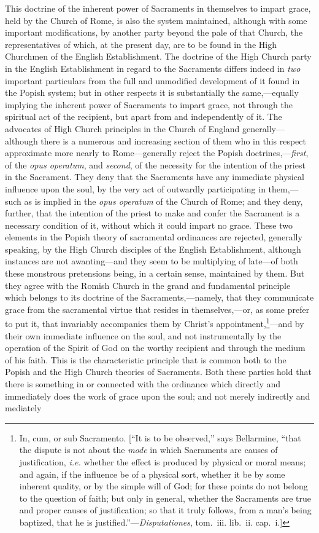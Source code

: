 \documentclass[
  english,
]{book}
\providecommand{\textlatin}{}
\renewcommand{\textlatin}[2][]{\foreignlanguage{latin}{#2}}
\begin{document}
This doctrine of the inherent power of Sacraments in themselves to impart grace, held by the Church of Rome, is also the system maintained, although with some important modifications, by another party beyond the pale of that Church, the representatives of which, at the present day, are to be found in the High Churchmen of the English Establishment. The doctrine of the High Church party in the English Establishment in regard to the Sacraments differs indeed in \emph{two} important particulars from the full and unmodified development of it found in the Popish system; but in other respects it is substantially the same,---equally implying the inherent power of Sacraments to impart grace, not through the spiritual act of the recipient, but apart from and independently of it. The advocates of High Church principles in the Church of England generally---although there is a numerous and increasing section of them who in this respect approximate more nearly to Rome---generally reject the Popish doctrines,---\emph{first}, of the \textlatin{\emph{opus operatum}}, and \emph{second}, of the necessity for the intention of the priest in the Sacrament. They deny that the Sacraments have any immediate physical influence upon the soul, by the very act of outwardly participating in them,---such as is implied in the \textlatin{\emph{opus operatum}} of the Church of Rome; and they deny, further, that the intention of the priest to make and confer the Sacrament is a necessary condition of it, without which it could impart no grace. These two elements in the Popish theory of sacramental ordinances are rejected, generally speaking, by the High Church disciples of the English Establishment, although instances are not awanting---and they seem to be multiplying of late---of both these monstrous pretensions being, in a certain sense, maintained by them. But they agree with the Romish Church in the grand and fundamental principle which belongs to its doctrine of the Sacraments,---namely, that they communicate grace from the sacramental virtue that resides in themselves,---or, as some prefer to put it, that invariably accompanies them by Christ's appointment,\footnote{In, \textlatin{cum}, or \textlatin{sub Sacramento}. {[}``It is to be observed,'' says Bellarmine, ``that the dispute is not about the \emph{mode} in which Sacraments are causes of justification, \emph{i.e.} whether the effect is produced by physical or moral means; and again, if the influence be of a physical sort, whether it be by some inherent quality, or by the simple will of God; for these points do not belong to the question of faith; but only in general, whether the Sacraments are true and proper causes of justification; so that it truly follows, from a man's being baptized, that he is justified.''---\textlatin{\emph{Disputationes}}, tom.~iii. lib.~ii. cap.~i.{]}}---and by their own immediate influence on the soul, and not instrumentally by the operation of the Spirit of God on the worthy recipient and through the medium of his faith. This is the characteristic principle that is common both to the Popish and the High Church theories of Sacraments. Both these parties hold that there is something in or connected with the ordinance which directly and immediately does the work of grace upon the soul; and not merely indirectly and mediately 
\end{document}
